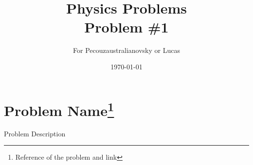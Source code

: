 \documentclass{article}
\begin{document}
\title{Physics Problems\\ Problem \#1}

\author{For Pecouzaustralianovsky or Lucas}

\date{\today}
\maketitle


\section*{Problem Name\footnote{Reference of the problem and link}}

Problem Description\\

\end{document}
